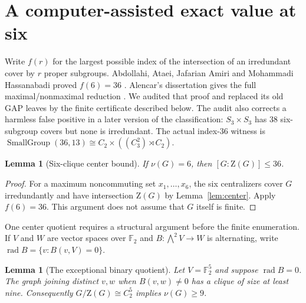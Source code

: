 \documentclass[11pt]{article}
\newtheorem{lemma}[theorem]{Lemma}
\theoremstyle{remark}
\newcommand{\nuG}{\nu}
\newcommand{\F}{\mathbb F}
\newcommand{\Z}{\mathrm Z}
\begin{document}
\section{A computer-assisted exact value at six}

Write $f(r)$ for the largest possible index of the intersection of an
irredundant cover by $r$ proper subgroups.  Abdollahi, Ataei, Jafarian Amiri
and Mohammadi Hassanabadi proved $f(6)=36$
\cite{abdollahi_ataei_jafarian_hassanabadi_2005}.  Alencar's dissertation
gives the full maximal/nonmaximal reduction
\cite[Chapters~2--5]{alencar_2011}.  We audited that proof and replaced its
old GAP leaves by the finite certificate described below.  The audit also
corrects a harmless false positive in a later version of the classification:
$S_3\times S_3$ has 38 six-subgroup covers but none is irredundant.  The
actual index-36 witness is
$\operatorname{SmallGroup}(36,13)\cong
C_2\times((C_3^2)\rtimes C_2)$.

\begin{lemma}[Six-clique center bound]\label{lem:index-six}
If $\nuG(G)=6$, then $[G:\Z(G)]\le36$.
\end{lemma}

\begin{proof}
For a maximum noncommuting set $x_1,\ldots,x_6$, the six centralizers cover
$G$ irredundantly and have intersection $\Z(G)$ by
Lemma~\ref{lem:center}.  Apply $f(6)=36$.  This argument does not assume that
$G$ itself is finite.
\end{proof}

One center quotient requires a structural argument before the finite
enumeration.  If $V$ and $W$ are vector spaces over $\F_2$ and
$B:\bigwedge^2V\to W$ is alternating, write
$\operatorname{rad}B=\{v:B(v,V)=0\}$.

\begin{lemma}[The exceptional binary quotient]\label{lem:c2five}
Let $V=\F_2^5$ and suppose $\operatorname{rad}B=0$.  The graph joining
distinct $v,w$ when $B(v,w)\ne0$ has a clique of size at least nine.
Consequently $G/\Z(G)\cong C_2^5$ implies $\nuG(G)\ge9$.
\end{lemma}
\end{document}
